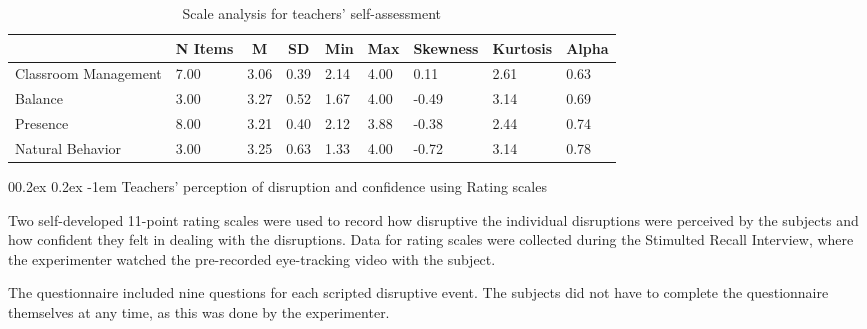 \documentclass[
  man]{apa6}
\makeatletter
\let\oldparagraph\paragraph
\renewcommand{\paragraph}[1]{\oldparagraph{#1}\mbox{}}
\renewcommand{\paragraph}{\@startsection{paragraph}{4}{\parindent}%
  {0\baselineskip \@plus 0.2ex \@minus 0.2ex}%
  {-1em}%
  {\normalfont\normalsize\bfseries\itshape\typesectitle}}
\makeatother
\begin{document}
\begin{table}[h]

\begin{center}
\begin{threeparttable}

\caption{\label{tab:presence_questionnaire}Scale analysis for teachers' self-assessment}

\tiny{

\begin{tabular}{lllllllll}
\toprule
 & \multicolumn{1}{c}{N Items} & \multicolumn{1}{c}{M} & \multicolumn{1}{c}{SD} & \multicolumn{1}{c}{Min} & \multicolumn{1}{c}{Max} & \multicolumn{1}{c}{Skewness} & \multicolumn{1}{c}{Kurtosis} & \multicolumn{1}{c}{Alpha}\\
\midrule
Classroom Management & 7.00 & 3.06 & 0.39 & 2.14 & 4.00 & 0.11 & 2.61 & 0.63\\
Balance & 3.00 & 3.27 & 0.52 & 1.67 & 4.00 & -0.49 & 3.14 & 0.69\\
Presence & 8.00 & 3.21 & 0.40 & 2.12 & 3.88 & -0.38 & 2.44 & 0.74\\
Natural Behavior & 3.00 & 3.25 & 0.63 & 1.33 & 4.00 & -0.72 & 3.14 & 0.78\\
\bottomrule
\end{tabular}

}

\end{threeparttable}
\end{center}

\end{table}

\paragraph{Teachers' perception of disruption and confidence using Rating scales}\label{teachers-perception-of-disruption-and-confidence-using-rating-scales}

Two self-developed 11-point rating scales were used to record how disruptive the individual disruptions were perceived by the subjects and how confident they felt in dealing with the disruptions. Data for rating scales were collected during the Stimulted Recall Interview, where the experimenter watched the pre-recorded eye-tracking video with the subject.

The questionnaire included nine questions for each scripted disruptive event. The subjects did not have to complete the questionnaire themselves at any time, as this was done by the experimenter.
\end{document}

